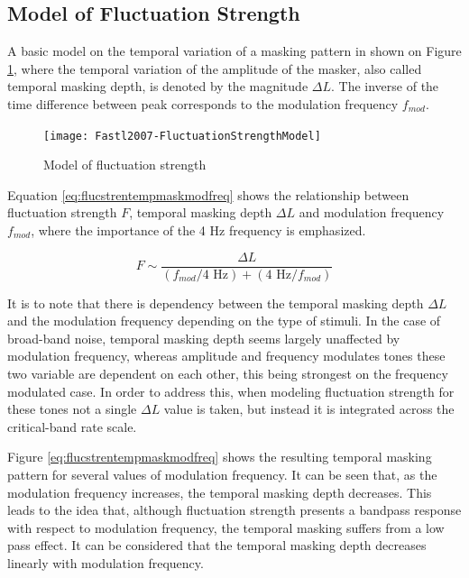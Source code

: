 \subsection{Model of Fluctuation Strength}

A basic model on the temporal variation of a masking pattern in shown on Figure
\ref{fig:flucstrenmodel}, where the temporal variation of the amplitude of the
masker, also called temporal masking depth, is denoted by the magnitude
$\Delta L$. The inverse of the time difference between peak corresponds to the
modulation frequency $f_{mod}$.

\begin{figure}
    \centering
    \texttt{[image: Fastl2007-FluctuationStrengthModel]}
    \caption{Model of fluctuation strength
        \cite[pp. 254]{Fastl2007Psychoacoustics}}
    \label{fig:flucstrenmodel}
\end{figure}

Equation \ref{eq:flucstrentempmaskmodfreq} shows the relationship between
fluctuation strength $F$, temporal masking depth $\Delta L$ and modulation
frequency $f_{mod}$, where the importance of the 4 Hz frequency is emphasized.

\begin{equation}
    F \sim \frac{\Delta L}{(f_{mod}/4\text{ Hz}) + (4\text{ Hz}/f_{mod})}
    \label{eq:flucstrentempmaskmodfreq}
\end{equation}

It is to note that there is dependency between the temporal masking depth
$\Delta L$ and the modulation frequency depending on the type of stimuli. In the
case of broad-band noise, temporal masking depth seems largely unaffected by 
modulation frequency, whereas amplitude and frequency modulates tones these two
variable are dependent on each other, this being strongest on the frequency
modulated case. In order to address this, when modeling fluctuation strength
for these tones not a single $\Delta L$ value is taken, but instead it is
integrated across the critical-band rate scale.

Figure \ref{eq:flucstrentempmaskmodfreq} shows the resulting temporal masking
pattern for several values of modulation frequency. It can be seen that, as the
modulation frequency increases, the temporal masking depth decreases. This leads
to the idea that, although fluctuation strength presents a bandpass response
with respect to modulation frequency, the temporal masking suffers from a
low pass effect. It can be considered that the temporal masking depth decreases
linearly with modulation frequency.

